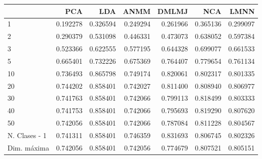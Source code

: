\begin{tabular}{lrrrrrr}
\toprule
{} &       PCA &       LDA &      ANMM &     DMLMJ &       NCA &      LMNN \\
\midrule
1             &  0.192278 &  0.326594 &  0.249294 &  0.261966 &  0.365136 &  0.299097 \\
2             &  0.290379 &  0.531098 &  0.446331 &  0.473073 &  0.638052 &  0.597384 \\
3             &  0.523366 &  0.622555 &  0.577195 &  0.644328 &  0.699077 &  0.661533 \\
5             &  0.665401 &  0.732226 &  0.675369 &  0.764407 &  0.779654 &  0.761134 \\
10            &  0.736493 &  0.865798 &  0.749174 &  0.820061 &  0.802317 &  0.801335 \\
20            &  0.744202 &  0.858401 &  0.742027 &  0.811400 &  0.808940 &  0.806977 \\
30            &  0.741763 &  0.858401 &  0.742066 &  0.799113 &  0.818499 &  0.803333 \\
40            &  0.741753 &  0.858401 &  0.742066 &  0.795693 &  0.819290 &  0.807620 \\
50            &  0.742056 &  0.858401 &  0.742066 &  0.787084 &  0.811228 &  0.804567 \\
N. Clases - 1 &  0.741311 &  0.858401 &  0.746359 &  0.831693 &  0.806745 &  0.802326 \\
Dim. máxima   &  0.742056 &  0.858401 &  0.742056 &  0.774679 &  0.807521 &  0.805151 \\
\bottomrule
\end{tabular}
